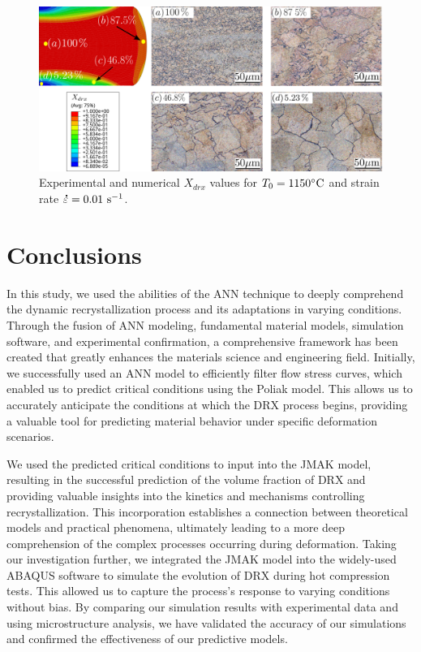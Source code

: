 \documentclass[metals,article,submit,pdftex,moreauthors]{Definitions/mdpi}
\DeclareRobustCommand{\mdot}[1]{\accentset{\mbox{\bfseries .}}{#1}}
\DeclareRobustCommand{\ps}{\text{s}^{-1}}
\begin{document}
\begin{figure}[H]
\centering
\includegraphics[width=0.98\columnwidth]{Figures/drxExpNum}
\caption{Experimental and numerical $X_{drx}$ values for $T_0=1150\celsius$ and strain rate $\mdot{\varepsilon}=0.01~\ps$.}
\label{fig:expNumDRX}
\end{figure}

\section{Conclusions\label{sec:Conclusions}}

In this study, we used the abilities of the ANN technique to deeply comprehend the dynamic recrystallization process and its adaptations in varying conditions.
Through the fusion of ANN modeling, fundamental material models, simulation software, and experimental confirmation, a comprehensive framework has been created that greatly enhances the materials science and engineering field.
Initially, we successfully used an ANN model to efficiently filter flow stress curves, which enabled us to predict critical conditions using the Poliak model.
This allows us to accurately anticipate the conditions at which the DRX process begins, providing a valuable tool for predicting material behavior under specific deformation scenarios.

We used the predicted critical conditions to input into the JMAK model, resulting in the successful prediction of the volume fraction of DRX and providing valuable insights into the kinetics and mechanisms controlling recrystallization.
This incorporation establishes a connection between theoretical models and practical phenomena, ultimately leading to a more deep comprehension of the complex processes occurring during deformation.
Taking our investigation further, we integrated the JMAK model into the widely-used ABAQUS software to simulate the evolution of DRX during hot compression tests.
This allowed us to capture the process's response to varying conditions without bias.
By comparing our simulation results with experimental data and using microstructure analysis, we have validated the accuracy of our simulations and confirmed the effectiveness of our predictive models.
\end{document}
